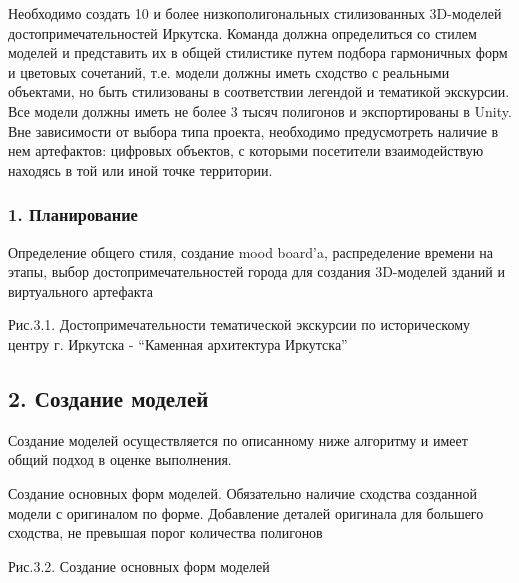 
Необходимо создать 10 и более низкополигональных стилизованных 3D-моделей достопримечательностей Иркутска. Команда должна определиться со стилем моделей и представить их в общей стилистике путем подбора гармоничных форм и цветовых сочетаний, т.е. модели должны иметь сходство с реальными объектами, но быть стилизованы в соответствии легендой и тематикой экскурсии. Все модели должны иметь не более 3 тысяч полигонов и экспортированы в Unity. Вне зависимости от выбора типа проекта, необходимо предусмотреть наличие в нем артефактов: цифровых объектов, с которыми посетители взаимодействую находясь в той или иной точке территории.

\subsubsection*{1. Планирование}

Определение общего стиля, создание mood board'a, распределение времени на этапы, выбор достопримечательностей города для создания 3D-моделей зданий и виртуального артефакта






\begin{center}
    Рис.3.1. Достопримечательности тематической экскурсии по историческому центру г. Иркутска - “Каменная архитектура Иркутска”
\end{center}

\subsection*{2. Создание моделей}

Создание моделей осуществляется по описанному ниже алгоритму и имеет общий подход в оценке выполнения.

Создание основных форм моделей. Обязательно наличие сходства созданной модели с оригиналом по форме. Добавление деталей оригинала для большего сходства, не превышая порог количества полигонов



\begin{center}
    Рис.3.2. Создание основных форм моделей
\end{center}

